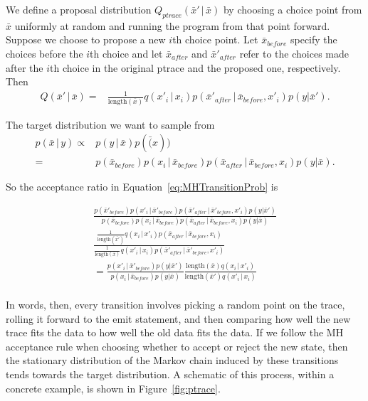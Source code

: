 \documentclass{article}
\newcommand{\given}{\, |\,}
\begin{document}
We define a proposal distribution $Q_{ptrace}(\bar{x}'\given \bar{x} )$ by
choosing a choice point from $\bar{x}$ uniformly at random and running the program
from that point forward. Suppose we choose to propose a new $i$th choice point.
Let $\bar{x}_{before}$ specify the choices before the $i$th choice and let
$\bar{x}_{after}$ and $\bar{x}'_{after}$ refer to the choices made after the
$i$th choice in the original ptrace and the proposed one, respectively. Then
\begin{align}
Q(\bar{x}' \given \bar{x}) =& \frac{1}{\text{length}(\bar{x})} 
                            q(x'_i \given x_i) p(\bar{x}'_{after} \given
                            \bar{x}_{before}, x'_i)
                            p(y | \bar{x}').
\end{align}

The target distribution we want to sample from 
\begin{align}
p(\bar{x} \given y) \propto & p(y \given \bar{x}) p(\bar(x))\\
                    =& p(\bar{x}_{before}) p(x_i \given \bar{x}_{before})
                    p(\bar{x}_{after} \given \bar{x}_{before}, x_i)
                    p(y|\bar{x}).
\end{align}

So the acceptance ratio in Equation~\ref{eq:MHTransitionProb} is

\begin{align}
\frac{p(\bar{x}'_{before}) p(x'_i \given \bar{x}'_{before})
                    p(\bar{x}'_{after} \given \bar{x}'_{before}, x'_i)
                   p(y|\bar{x}')}
                   {p(\bar{x}_{before}) p(x_i \given \bar{x}_{before})
                    p(\bar{x}_{after} \given \bar{x}_{before}, x_i)
                    p(y|\bar{x})}\\
\frac{\frac{1}{\text{length}(\bar{x'})} 
                           q(x_i \given x'_i) p(\bar{x}_{after} \given \bar{x}_{before}, x_i)
                        }{\frac{1}{\text{length}(\bar{x})} 
                           q(x'_i \given x_i) p(\bar{x}'_{after} \given
                           \bar{x}'_{before}, x'_i)}\\
= \frac{p(x'_i \given \bar{x}'_{before})
        p(y|\bar{x}')}
{p(x_i \given \bar{x}_{before})
 p(y|\bar{x})}
\frac{\text{length}(\bar{x})
    q(x_i \given x'_i) }
    {\text{length}(\bar{x}') 
    q(x'_i \given x_i)}\\
\end{align}

In words, then, every transition involves picking a random point on the trace,
rolling it forward to the emit statement, and then comparing how well the new
trace fits the data to how well the old data fits the data. If we follow the MH
acceptance rule when choosing whether to accept or reject the new state, then
the stationary distribution of the Markov chain induced by these transitions
tends towards the target distribution.  A schematic of this process, within a
concrete example, is shown in Figure~\ref{fig:ptrace}.  
\end{document}
